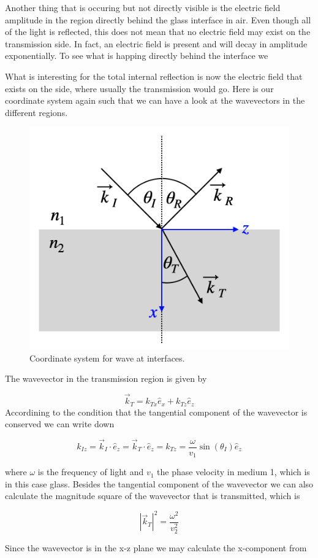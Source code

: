 \documentclass[
  a4paper,
]{book}
\begin{document}
Another thing that is occuring but not directly visible is the electric
field amplitude in the region directly behind the glass interface in
air. Even though all of the light is reflected, this does not mean that
no electric field may exist on the transmission side. In fact, an
electric field is present and will decay in amplitude exponentially. To
see what is happing directly behind the interface we

What is interesting for the total internal reflection is now the
electric field that exists on the side, where usually the transmission
would go. Here is our coordinate system again such that we can have a
look at the wavevectors in the different regions.

\begin{figure}[H]

{\centering \includegraphics[width=0.4\linewidth,height=\textheight,keepaspectratio]{electromagnetic-waves/img/coordinates.png}

}

\caption{Coordinate system for wave at interfaces.}

\end{figure}%

The wavevector in the transmission region is given by

\[
\vec{k}_T=k_{Tx} \hat{e}_x+k_{Tz} \hat{e}_z
\] Accordining to the condition that the tangential component of the
wavevector is conserved we can write down

\[
k_{Iz}=\vec{k}_I\cdot \hat{e}_z=\vec{k}_T\cdot \hat{e}_z=k_{Tz}=\frac{\omega}{v_1}\sin(\theta_I)\hat{e}_z
\]

where \(\omega\) is the frequency of light and \(v_1\) the phase
velocity in medium 1, which is in this case glass. Besides the
tangential component of the wavevector we can also calculate the
magnitude square of the wavevector that is transmitted, which is

\[
|\vec{k}_T|^2=\frac{\omega^2}{v_2^2}
\]

Since the wavevector is in the x-z plane we may calculate the
x-component from
\end{document}

